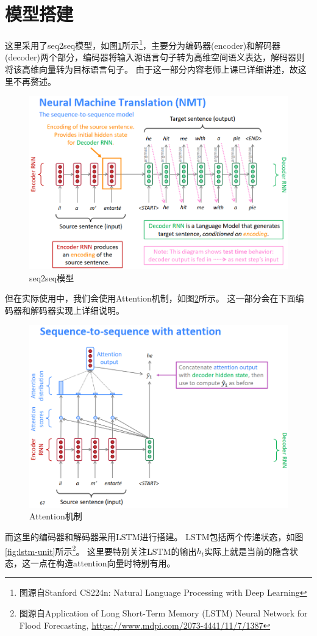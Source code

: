 \documentclass[logo,reportComp]{thesis}
\begin{document}
\section{模型搭建}
这里采用了seq2seq模型，如图\ref{fig:seq2seq}所示\footnote{图源自Stanford CS224n: Natural Language Processing with Deep Learning}，主要分为编码器(encoder)和解码器(decoder)两个部分，编码器将输入源语言句子转为高维空间语义表达，解码器则将该高维向量转为目标语言句子。
由于这一部分内容老师上课已详细讲述，故这里不再赘述。
\begin{figure}[H]
\centering
\includegraphics[width=0.8\linewidth]{fig/NMT.png}
\caption{seq2seq模型}
\label{fig:seq2seq}
\end{figure}

但在实际使用中，我们会使用Attention机制，如图\ref{fig:attention}所示。
这一部分会在下面编码器和解码器实现上详细说明。
\begin{figure}[H]
\centering
\includegraphics[width=0.8\linewidth]{fig/attention.png}
\caption{Attention机制}
\label{fig:attention}
\end{figure}

而这里的编码器和解码器采用LSTM进行搭建。
LSTM包括两个传递状态，如图\ref{fig:lstm-unit}所示\footnote{图源自Application of Long Short-Term Memory (LSTM) Neural Network for Flood Forecasting, \url{https://www.mdpi.com/2073-4441/11/7/1387}}。
这里要特别关注LSTM的输出$h_t$实际上就是当前的隐含状态，这一点在构造attention向量时特别有用。
\end{document}
